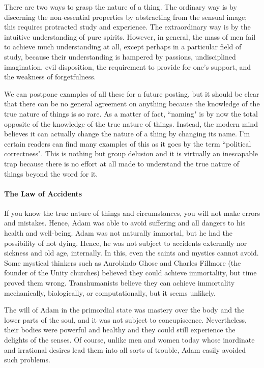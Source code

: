 There are two ways to grasp the nature of a thing. The ordinary way is by discerning the non-essential properties by abstracting from the sensual image; this requires protracted study and experience. The extraordinary way is by the intuitive understanding of pure spirits. However, in general, the mass of men fail to achieve much understanding at all, except perhaps in a particular field of study, because their understanding is hampered by passions, undisciplined imagination, evil disposition, the requirement to provide for one's support, and the weakness of forgetfulness.

We can postpone examples of all these for a future posting, but it should be clear that there can be no general agreement on anything because the knowledge of the true nature of things is so rare. As a matter of fact, ``naming" is by now the total opposite of the knowledge of the true nature of things. Instead, the modern mind believes it can actually change the nature of a thing by changing its name. I'm certain readers can find many examples of this as it goes by the term ``political correctness". This is nothing but group delusion and it is virtually an inescapable trap because there is no effort at all made to understand the true nature of things beyond the word for it.

\paragraph{The Law of Accidents}
If you know the true nature of things and circumstances, you will not make errors and mistakes. Hence, Adam was able to avoid suffering and all dangers to his health and well-being. Adam was not naturally immortal, but he had the possibility of not dying. Hence, he was not subject to accidents externally nor sickness and old age, internally. In this, even the saints and mystics cannot avoid. Some mystical thinkers such as Aurobindo Ghose and Charles Fillmore (the founder of the Unity churches) believed they could achieve immortality, but time proved them wrong. Transhumanists believe they can achieve immortality mechanically, biologically, or computationally, but it seems unlikely.

The will of Adam in the primordial state was mastery over the body and the lower parts of the soul, and it was not subject to concupiscence. Nevertheless, their bodies were powerful and healthy and they could still experience the delights of the senses. Of course, unlike men and women today whose inordinate and irrational desires lead them into all sorts of trouble, Adam easily avoided such problems.

